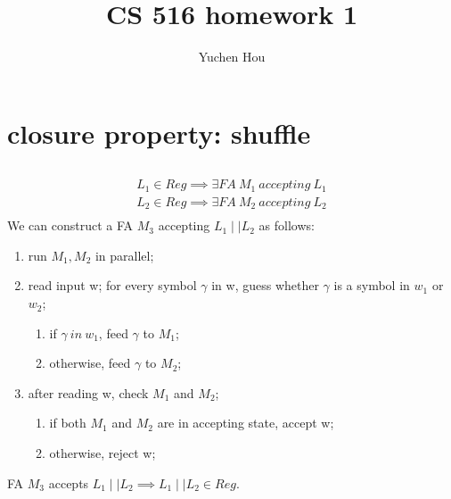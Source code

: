 \documentclass{article}
\begin{document}
\lstset{language=python}
\title{CS 516 homework 1}
\author{Yuchen Hou}
\maketitle

\section{closure property: shuffle}

\subsection{}

\begin{align*}
	L_1 \in Reg \implies \exists FA \ M_1 \ accepting \ L_1\\
	L_2 \in Reg \implies \exists FA \ M_2 \ accepting \ L_2\\
\end{align*}
We can construct a FA $ M_3 $ accepting $ L_1 \mid \mid  L_2 $ as follows:
\begin{enumerate}
	\item run $ M_1, M_2 $ in parallel;
	\item read input w; for every symbol $\gamma $ in w, guess whether $\gamma$ is a symbol in $ w_1 $ or $ w_2 $;
	\begin{enumerate}
		\item if $ \gamma \ in \ w_1 $, feed $ \gamma $ to $ M_1 $;
		\item otherwise, feed $ \gamma $ to $ M_2 $;
	\end{enumerate}
	\item after reading w, check $ M_1 $ and $ M_2 $;
	\begin{enumerate}
		\item if both $ M_1  $ and $ M_2 $ are in accepting state, accept w;
		\item otherwise, reject w;	
	\end{enumerate}
\end{enumerate}
FA $ M_3 $ accepts $L_1 \mid \mid  L_2 \implies L_1 \mid \mid  L_2 \in Reg$.

\subsection{}
\end{document}
